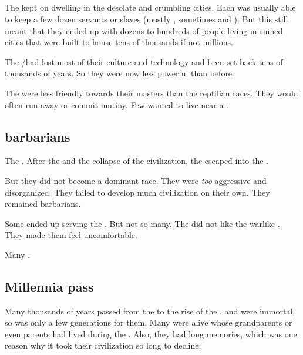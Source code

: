 \subsection{\QuilJaaran}
The \quiljaaran{} kept on dwelling in the desolate and crumbling \ophidian{} cities. 
Each \quiljaar{} was usually able to keep a few dozen servants or slaves (mostly \loculs, sometimes \cregorrs{} and \nephilim). 
But this still meant that they ended up with dozens to hundreds of people living in  ruined cities that were built to house tens of thousands if not millions. 

The \ophidians/\quiljaaran had lost most of their culture and technology and been set back tens of thousands of years.
So they were now less powerful than before. 

The \nephilim{} were less friendly towards their \quiljaaran{} masters than the reptilian races. 
They would often run away or commit mutiny. 
Few \nephilim{} wanted to live near a \quiljaar. 









\subsection{\Cregorr{} barbarians}
The \cregorrs{} . 
After the \firstbanewar{} and the collapse of the \ophidian{} civilization, the \cregorrs{} escaped into the \wylde. 

But they did not become a dominant race. 
They were \emph{too} aggressive and disorganized. 
They failed to develop much civilization on their own. 
They remained barbarians. 

Some \cregorrs{} ended up serving the \quiljaaran. 
But not so many. 
The \quiljaaran{} did not like the warlike \cregorrs. 
They made them feel uncomfortable. 

Many \cregorrs{} .









\subsection{Millennia pass}
Many thousands of years passed from the \firstbanewar{} to the rise of the \aryothim. 
\Dragons and \quiljaaran{} were immortal, so  was only a few generations for them. 
Many were alive whose grandparents or even parents had lived during the \banewar. 
Also, they had long memories, which was one reason why it took their civilization so long to decline. 

